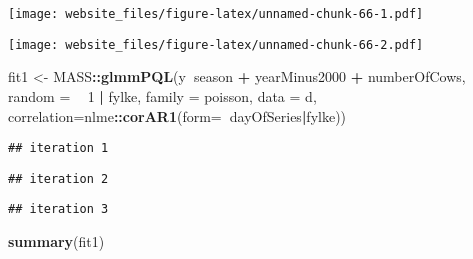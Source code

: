 \documentclass[]{book}
\newenvironment{Shaded}{\begin{snugshade}}{\end{snugshade}}
\newcommand{\KeywordTok}[1]{\textcolor[rgb]{0.13,0.29,0.53}{\textbf{#1}}}
\newcommand{\DataTypeTok}[1]{\textcolor[rgb]{0.13,0.29,0.53}{#1}}
\newcommand{\DecValTok}[1]{\textcolor[rgb]{0.00,0.00,0.81}{#1}}
\newcommand{\StringTok}[1]{\textcolor[rgb]{0.31,0.60,0.02}{#1}}
\newcommand{\OperatorTok}[1]{\textcolor[rgb]{0.81,0.36,0.00}{\textbf{#1}}}
\newcommand{\ErrorTok}[1]{\textcolor[rgb]{0.64,0.00,0.00}{\textbf{#1}}}
\newcommand{\NormalTok}[1]{#1}
\begin{document}
\begin{Shaded}
\end{Shaded}

\texttt{[image: website\_files/figure-latex/unnamed-chunk-66-1.pdf]}

\begin{Shaded}
\end{Shaded}

\texttt{[image: website\_files/figure-latex/unnamed-chunk-66-2.pdf]}

\begin{Shaded}
\begin{Highlighting}[]
\NormalTok{fit1 <-}\StringTok{ }\NormalTok{MASS}\OperatorTok{::}\KeywordTok{glmmPQL}\NormalTok{(y}\OperatorTok{~}\NormalTok{season }\OperatorTok{+}\StringTok{ }\NormalTok{yearMinus2000 }\OperatorTok{+}\StringTok{ }\NormalTok{numberOfCows, }\DataTypeTok{random =} \OperatorTok{~}\StringTok{ }\DecValTok{1} \OperatorTok{|}\StringTok{ }\NormalTok{fylke,}
                \DataTypeTok{family =}\NormalTok{ poisson, }\DataTypeTok{data =}\NormalTok{ d,}
                \DataTypeTok{correlation=}\NormalTok{nlme}\OperatorTok{::}\KeywordTok{corAR1}\NormalTok{(}\DataTypeTok{form=}\OperatorTok{~}\NormalTok{dayOfSeries}\OperatorTok{|}\NormalTok{fylke))}
\end{Highlighting}
\end{Shaded}

\begin{verbatim}
## iteration 1
\end{verbatim}

\begin{verbatim}
## iteration 2
\end{verbatim}

\begin{verbatim}
## iteration 3
\end{verbatim}

\begin{Shaded}
\begin{Highlighting}[]
\KeywordTok{summary}\NormalTok{(fit1)}
\end{Highlighting}
\end{Shaded}
\end{document}
